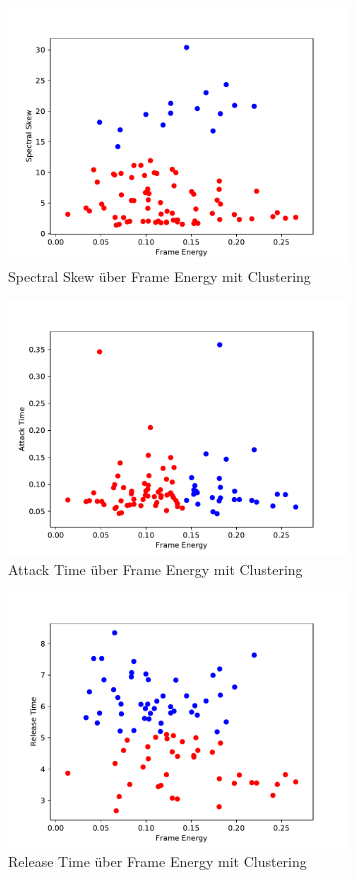 \begin{figure}[H]
    \center
    \includegraphics[width = 0.8\textwidth]{Figures/spectral_skew_c}
    \caption{Spectral Skew über Frame Energy mit Clustering }
    \label{fig:spectral_skew_c}
\end{figure}

\begin{figure}[H]
    \center
    \includegraphics[width = 0.8\textwidth]{Figures/attack_time_c}
    \caption{Attack Time über Frame Energy mit Clustering }
    \label{fig:attack_time_c}
\end{figure}

\begin{figure}[H]
    \center
    \includegraphics[width = 0.8\textwidth]{Figures/release_time_c.pdf}
    \caption{Release Time über Frame Energy mit Clustering}
    \label{fig:release_time_c}
\end{figure}

